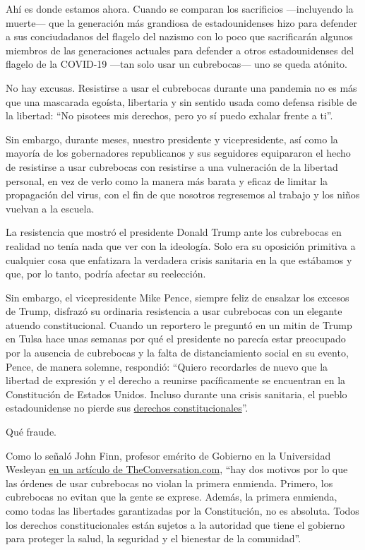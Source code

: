 Ahí es donde estamos ahora. Cuando se comparan los sacrificios
---incluyendo la muerte--- que la generación más grandiosa de
estadounidenses hizo para defender a sus conciudadanos del flagelo del
nazismo con lo poco que sacrificarán algunos miembros de las
generaciones actuales para defender a otros estadounidenses del flagelo
de la COVID-19 ---tan solo usar un cubrebocas--- uno se queda atónito.

No hay excusas. Resistirse a usar el cubrebocas durante una pandemia no
es más que una mascarada egoísta, libertaria y sin sentido usada como
defensa risible de la libertad: ``No pisotees mis derechos, pero yo sí
puedo exhalar frente a ti''.

Sin embargo, durante meses, nuestro presidente y vicepresidente, así
como la mayoría de los gobernadores republicanos y sus seguidores
equipararon el hecho de resistirse a usar cubrebocas con resistirse a
una vulneración de la libertad personal, en vez de verlo como la manera
más barata y eficaz de limitar la propagación del virus, con el fin de
que nosotros regresemos al trabajo y los niños vuelvan a la escuela.

La resistencia que mostró el presidente Donald Trump ante los cubrebocas
en realidad no tenía nada que ver con la ideología. Solo era su
oposición primitiva a cualquier cosa que enfatizara la verdadera crisis
sanitaria en la que estábamos y que, por lo tanto, podría afectar su
reelección.

Sin embargo, el vicepresidente Mike Pence, siempre feliz de ensalzar los
excesos de Trump, disfrazó su ordinaria resistencia a usar cubrebocas
con un elegante atuendo constitucional. Cuando un reportero le preguntó
en un mitin de Trump en Tulsa hace unas semanas por qué el presidente no
parecía estar preocupado por la ausencia de cubrebocas y la falta de
distanciamiento social en su evento, Pence, de manera solemne,
respondió: ``Quiero recordarles de nuevo que la libertad de expresión y
el derecho a reunirse pacíficamente se encuentran en la Constitución de
Estados Unidos. Incluso durante una crisis sanitaria, el pueblo
estadounidense no pierde sus
\href{https://www.esquire.com/news-politics/politics/a32984272/mike-pence-masks-social-distancing-trump-rallies/}{derechos
constitucionales}''.

Qué fraude.

Como lo señaló John Finn, profesor emérito de Gobierno en la Universidad
Wesleyan
\href{https://theconversation.com/the-constitution-doesnt-have-a-problem-with-mask-mandates-142335}{en
un artículo de TheConversation.com}, ``hay dos motivos por lo que las
órdenes de usar cubrebocas no violan la primera enmienda. Primero, los
cubrebocas no evitan que la gente se exprese. Además, la primera
enmienda, como todas las libertades garantizadas por la Constitución, no
es absoluta. Todos los derechos constitucionales están sujetos a la
autoridad que tiene el gobierno para proteger la salud, la seguridad y
el bienestar de la comunidad''.

